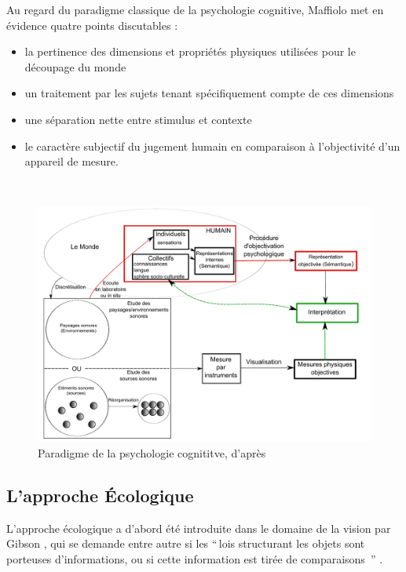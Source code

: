 Au regard du paradigme classique de la psychologie cognitive, Maffiolo met en évidence quatre points discutables :

\begin{itemize}
\item la pertinence des dimensions et propriétés physiques utilisées pour le découpage du monde
\item un traitement par les sujets tenant spécifiquement compte de ces dimensions
\item une séparation nette entre stimulus et contexte
\item le caractère subjectif du jugement humain en comparaison à l'objectivité d'un appareil de mesure.
\end{itemize}

 \\

\begin{figure}[bth]
        \myfloatalign
        \includegraphics[width=\linewidth]{gfx/Shema_maffiolo}
        \caption[Paradigme de la psychologie cognititve]{Paradigme de la psychologie cognititve, d'après \citep{maffiolo_caracterisation_1999}}\label{fig:paradigme Cognitivisme}
\end{figure}

\subsection{L'approche Écologique}
\label{sec:ch3_ecologique}

L'approche écologique a d'abord été introduite dans le domaine de la vision par Gibson \citep{gibson1966senses}, qui se demande entre autre si les ``\,lois structurant les objets sont porteuses d'informations, ou si cette information est tirée de comparaisons \,'' \citep{gibson1978ecological}.

